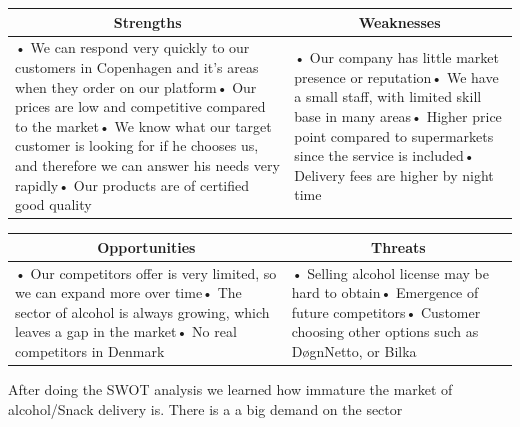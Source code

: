 \documentclass[12p]{article}
\begin{document}
\begin{table}[htbp]
  \centering
    \begin{tabular}{|p{}|p{}|}
    \hline
    \multicolumn{1}{|c|}{\textbf{Strengths}} & \multicolumn{1}{c|}{\textbf{Weaknesses}} \\
    \hline
    {• We can respond very quickly to our customers in Copenhagen and it's areas when they order on our platform\newline{}• Our prices are low and competitive compared to the market\newline{}• We know what our target customer is looking for if he chooses us, and therefore we can answer his needs very rapidly\newline{}• Our products are of certified good quality} & • Our company has little market presence or reputation\newline{}• We have a small staff, with limited skill base in many areas\newline{}• Higher price point compared to supermarkets since the service is included\newline{}• Delivery fees are higher by night time \\
    \hline
    \end{tabular}
  \label{tab:swot_one}
\end{table}

\begin{table}[htbp]
  \centering
    \begin{tabular}{|p{}|p{}|}
    \hline
    \multicolumn{1}{|c|}{\textbf{Opportunities}} & \multicolumn{1}{c|}{\textbf{Threats}} \\
    \hline
    {• Our competitors offer is very limited, so we can expand more over time\newline{}• The sector of alcohol is always growing, which leaves a gap in the market\newline{}• No real competitors in Denmark} & • Selling alcohol license may be hard to obtain\newline{}• Emergence of future competitors\newline{}• Customer choosing other options such as DøgnNetto, or Bilka \\
    \hline
    \end{tabular}
  \label{tab:swot_two}
\end{table}

After doing the SWOT analysis we learned how immature the market of alcohol/Snack delivery is. There is a a big demand on the sector  
\end{document}
